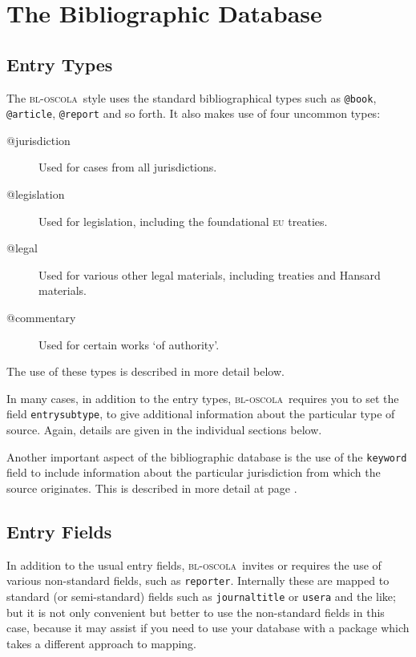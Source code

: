 \documentclass[a4paper,
               11pt,
	       DIV=1,			   
	       footinclude=false]
	      {scrartcl}
\newcommand{\oscola}{\textsc{bl-oscola}}
\begin{document}
\section{The Bibliographic Database}

\subsection{Entry Types}

The \oscola\ style uses the standard bibliographical types such as
\texttt{@book}, \texttt{@article}, \texttt{@report} and so forth. It
also makes use of four uncommon types:
\begin{description}
\item[@jurisdiction] Used for cases from all jurisdictions.
\item[@legislation] Used for legislation, including the foundational \textsc{eu} treaties.
\item[@legal] Used for various other legal materials, including treaties and Hansard materials.
\item[@commentary] Used for certain works `of authority'.
\end{description}
The use of these types is described in more detail below.

In many cases, in addition to the entry types, \oscola\ requires you
to set the field \texttt{entrysubtype}, to give additional information
about the particular type of source. Again, details are given in the
individual sections below.

Another important aspect of the bibliographic database is the use of
the \texttt{keyword} field to include information about the particular
jurisdiction from which the source originates. This is described in
more detail at page \pageref{countries}.

\subsection{Entry Fields}

In addition to the usual entry fields, \oscola\ invites or requires
the use of various non-standard fields, such as
\texttt{reporter}. Internally these are mapped to standard (or
semi-standard) fields such as \texttt{journaltitle} or \texttt{usera}
and the like; but it is not only convenient but better to use the
non-standard fields in this case, because it may assist if you need to
use your database with a package which takes a different approach to
mapping.
\end{document}
